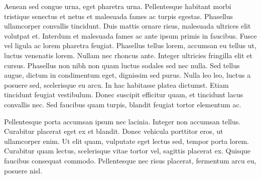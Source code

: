 \documentclass[a4paper]{article}
\begin{document}
Aenean sed congue urna, eget pharetra urna. Pellentesque habitant morbi tristique senectus et netus et malesuada fames ac turpis egestas. Phasellus ullamcorper convallis tincidunt. Duis mattis ornare risus, malesuada ultrices elit volutpat et. Interdum et malesuada fames ac ante ipsum primis in faucibus. Fusce vel ligula ac lorem pharetra feugiat. Phasellus tellus lorem, accumsan eu tellus ut, luctus venenatis lorem. Nullam nec rhoncus ante. Integer ultricies fringilla elit et cursus. Phasellus non nibh non quam luctus sodales sed nec nulla. Sed tellus augue, dictum in condimentum eget, dignissim sed purus. Nulla leo leo, luctus a posuere sed, scelerisque eu arcu. In hac habitasse platea dictumst. Etiam tincidunt feugiat vestibulum. Donec suscipit efficitur quam, et tincidunt lacus convallis nec. Sed faucibus quam turpis, blandit feugiat tortor elementum ac.

Pellentesque porta accumsan ipsum nec lacinia. Integer non accumsan tellus. Curabitur placerat eget ex et blandit. Donec vehicula porttitor eros, ut ullamcorper enim. Ut elit quam, vulputate eget lectus sed, tempor porta lorem. Curabitur quam lectus, scelerisque vitae tortor vel, sagittis placerat ex. Quisque faucibus consequat commodo. Pellentesque nec risus placerat, fermentum arcu eu, posuere nisl.
\end{document}
